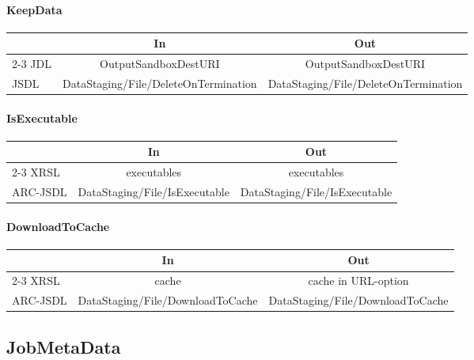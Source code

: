 \documentclass{article}
\newcommand{\NST}[1]{\normalsize{\textnormal{#1}}}
\newcommand{\subsubsubsection}[1]{\paragraph{#1}}
\newenvironment{inouttabular}%
{\begin{center}\begin{tabular}{l>{\ttfamily\footnotesize}c>{\ttfamily\footnotesize}c}%
\toprule
& \textnormal{\normalsize{In}} & \textnormal{\normalsize{Out}}\\ \cmidrule{2-3}}
{\bottomrule\end{tabular}\end{center}}
\begin{document}
\subsubsubsection{KeepData}
\begin{inouttabular}
JDL & OutputSandboxDestURI & OutputSandboxDestURI\\
JSDL & DataStaging/File/DeleteOnTermination & DataStaging/File/DeleteOnTermination\\
\end{inouttabular}

\subsubsubsection{IsExecutable}
\begin{inouttabular}
XRSL & executables & executables\\
ARC-JSDL & DataStaging/File/IsExecutable & DataStaging/File/IsExecutable\\
\end{inouttabular}

\subsubsubsection{DownloadToCache}
\begin{inouttabular}
XRSL & cache & \NST{cache in URL-option}\\
ARC-JSDL & DataStaging/File/DownloadToCache & DataStaging/File/DownloadToCache\\
\end{inouttabular}


\subsection{JobMetaData}
\end{document}
